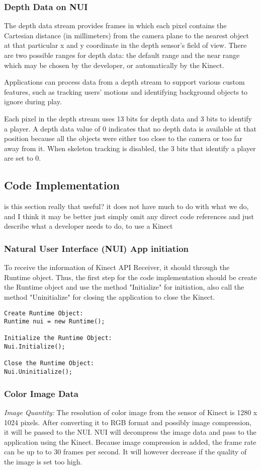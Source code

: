 \subsubsection{Depth Data on NUI}
The depth data stream provides frames in which each pixel contains the Cartesian distance (in millimeters) from the camera plane to the nearest object at that particular x and y coordinate in the depth sensor's field of view. There are two possible ranges for depth data: the default range and the near range which may be chosen by the developer, or automatically by the Kinect.

Applications can process data from a depth stream to support various custom features, such as tracking users' motions and identifying background objects to ignore during play.

Each pixel in the depth stream uses 13 bits for depth data and 3 bits to identify a player. A depth data value of 0 indicates that no depth data is available at that position because all the objects were either too close to the camera or too far away from it. When skeleton tracking is disabled, the 3 bits that identify a player are set to 0.

\subsection{Code Implementation}
{\color{red} is this section really that useful? it does not have much to do with what we do, and I think it may be better just simply omit any direct code references and just describe what a developer needs to do, to use a Kinect}
\subsubsection{Natural User Interface (NUI) App initiation}
To receive the information of Kinect API Receiver, it should through the Runtime object. Thus, the first step for the code implementation should be create the Runtime object and use the method "Initialize" for initiation, also call the method "Uninitialize" for closing the application to close the Kinect.

\begin{verbatim}
Create Runtime Object:
Runtime nui = new Runtime();

Initialize the Runtime Object:
Nui.Initialize();

Close the Runtime Object:
Nui.Uninitialize();
\end{verbatim}

\subsubsection{Color Image Data}
\textit{Image Quantity:} 
The resolution of color image from the sensor of Kinect is 1280 x 1024 pixels. After converting it to RGB format and possibly image compression, it will be passed to the NUI. NUI will decompress the image data and pass to the application using the Kinect. Because image compression is added, the frame rate can be up to to 30 frames per second. It will however decrease if the quality of the image is set too high.

